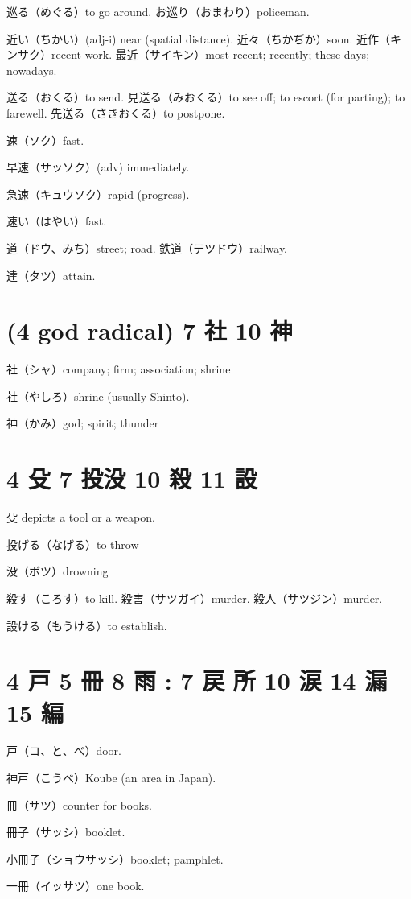 巡る（めぐる）to go around.
お巡り（おまわり）policeman.

近い（ちかい）(adj-i) near (spatial distance).
近々（ちかぢか）soon.
近作（キンサク）recent work.
最近（サイキン）most recent; recently; these days; nowadays.

送る（おくる）to send.
見送る（みおくる）to see off; to escort (for parting); to farewell.
先送る（さきおくる）to postpone.

速（ソク）fast.

早速（サッソク）(adv) immediately.

急速（キュウソク）rapid (progress).

速い（はやい）fast.

道（ドウ、みち）street; road.
鉄道（テツドウ）railway.

達（タツ）attain.

\section{(4 god radical) 7 社 10 神}

社（シャ）company; firm; association; shrine

社（やしろ）shrine (usually Shinto).

神（かみ）god; spirit; thunder

\section{4 殳 7 投没 10 殺 11 設}

殳 depicts a tool or a weapon.

投げる（なげる）to throw

没（ボツ）drowning

殺す（ころす）to kill.
殺害（サツガイ）murder.
殺人（サツジン）murder.

設ける（もうける）to establish.

\section{4 戸 5 冊 8 雨 : 7 戻 所 10 涙 14 漏 15 編}

戸（コ、と、べ）door.

神戸（こうべ）Koube (an area in Japan).

冊（サツ）counter for books.

冊子（サッシ）booklet.

小冊子（ショウサッシ）booklet; pamphlet.

一冊（イッサツ）one book.

